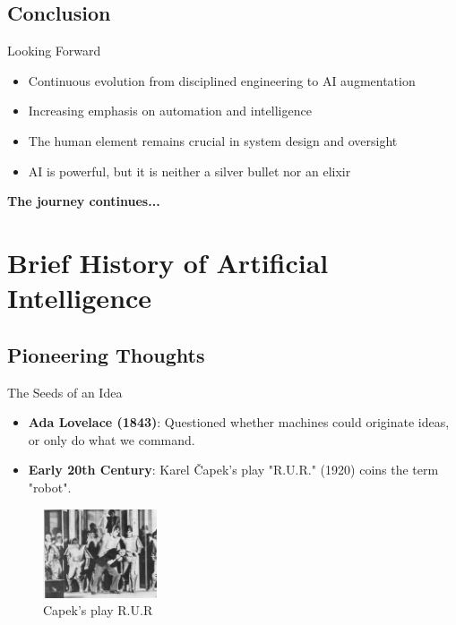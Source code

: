 \documentclass{beamer}
\begin{document}
\subsection{Conclusion}


\begin{frame}[t]{Looking Forward}
\begin{itemize}
    \item Continuous evolution from disciplined engineering to AI augmentation
    \item Increasing emphasis on automation and intelligence
    \item The human element remains crucial in system design and oversight
    \item AI is powerful, but it is neither a silver bullet nor an elixir
\end{itemize}
\begin{center}
    \textbf{The journey continues...}
\end{center}
\end{frame}
\section{Brief History of Artificial Intelligence}
\subsection{Pioneering Thoughts}
\begin{frame}[t]{The Seeds of an Idea}
    \begin{itemize}
        \item \textbf{Ada Lovelace (1843)}: Questioned whether machines could originate ideas, or only do what we command.
        \item \textbf{Early 20th Century}: Karel Čapek's play "R.U.R." (1920) coins the term "robot".
    \end{itemize}

    \begin{figure}
        \includegraphics[width=0.3\textwidth]{images/Capek_RUR.jpg}
        \caption{Capek's play R.U.R}
    \end{figure}
\end{frame}
\end{document}
